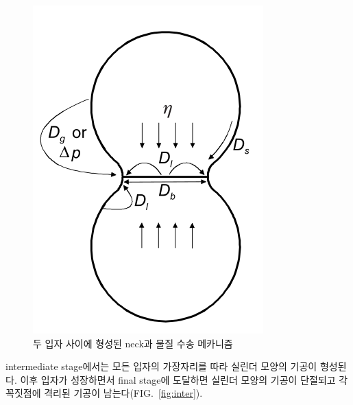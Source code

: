 \documentclass[aps,reprint,superscriptaddress,11pt]{revtex4-2}
\begin{document}
\begin{figure}[htbp]
  \centering
  \includegraphics[scale=0.4]{transport.png}
  \caption{두 입자 사이에 형성된 neck과 물질 수송 메카니즘}\label{fig:transport}
\end{figure}

intermediate stage에서는 모든 입자의 가장자리를 따라 실린더 모양의 기공이 형성된다. 
이후 입자가 성장하면서 final stage에 도달하면 실린더 모양의 기공이 단절되고 각 꼭짓점에 
격리된 기공이 남는다(FIG.~\ref{fig:inter}). 
\end{document}
